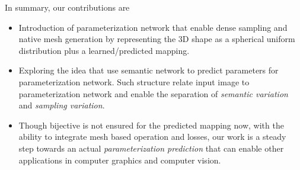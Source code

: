In summary, our contributions are
\begin{itemize}
	\item  Introduction of parameterization network that enable dense sampling and native mesh generation by representing the 3D shape as a spherical uniform distribution plus a learned/predicted mapping.
	\item  Exploring the idea that use semantic network to predict parameters for parameterization network. Such structure relate input image to parameterization network and enable the separation of \textit{semantic variation} and \textit{sampling variation}.
	\item Though bijective is not ensured for the predicted mapping now, with the ability to integrate mesh based operation and losses, our work is a steady step towards an actual \emph{parameterization prediction} that can enable other applications in computer graphics and computer vision.
\end{itemize}          

